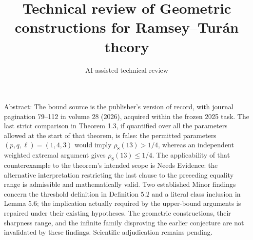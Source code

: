 \documentclass[10pt]{article}
\title{Technical review of
Geometric constructions for Ramsey–Turán theory}
\author{AI-assisted technical review}
\date{}
\begin{document}
\maketitle
Abstract: The bound source is the publisher’s version of record, with journal pagination 79–112 in volume 28 (2026), acquired within the frozen 2025 task. The last strict comparison in Theorem 1.3, if quantified over all the parameters allowed at the start of that theorem, is false: the permitted parameters \((p,q,\ell)=(1,4,3)\) would imply \(\rho_8(13)>1/4\), whereas an independent weighted extremal argument gives \(\rho_8(13)\leq1/4\). The applicability of that counterexample to the theorem’s intended scope is Needs Evidence: the alternative interpretation restricting the last clause to the preceding equality range is admissible and mathematically valid. Two established Minor findings concern the threshold definition in Definition 5.2 and a literal class inclusion in Lemma 5.6; the implication actually required by the upper-bound arguments is repaired under their existing hypotheses. The geometric constructions, their sharpness range, and the infinite family disproving the earlier conjecture are not invalidated by these findings. Scientific adjudication remains pending.\par
\end{document}
